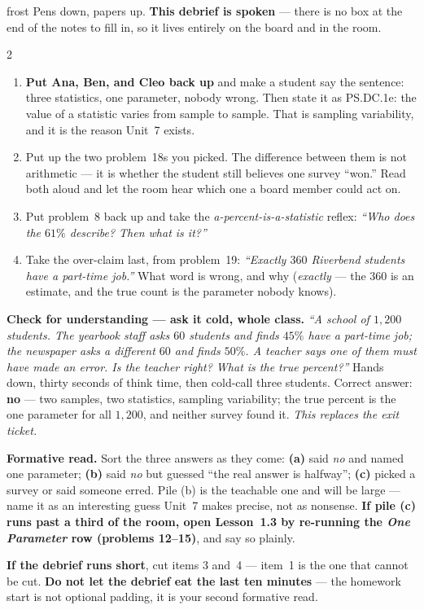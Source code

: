 \documentclass[10pt]{article}
\begin{document}
\boxguard[24]
\begin{skillbox}{frost}
Pens down, papers up. \textbf{This debrief is spoken} --- there is no box at the end of the
notes to fill in, so it lives entirely on the board and in the room.
\begin{multicols}{2}
\begin{enumerate}[leftmargin=1.3em, nosep, itemsep=3pt]
  \item \textbf{Put Ana, Ben, and Cleo back up} and make a student say the sentence: three
        statistics, one parameter, nobody wrong. Then state it as PS.DC.1e: the value of a
        statistic varies from sample to sample. That is sampling variability, and it is the
        reason Unit~7 exists.
  \item Put up the two problem~18s you picked. The difference between them is
        not arithmetic --- it is whether the student still believes one survey ``won.'' Read
        both aloud and let the room hear which one a board member could act on.
  \item Put problem~8 back up and take the \emph{a-percent-is-a-statistic} reflex:
        \emph{``Who does the $61\%$ describe? Then what is it?''}
  \item Take the over-claim last, from problem~19: \emph{``Exactly $360$ Riverbend students have a part-time job.''} What word is wrong, and why (\emph{exactly} --- the $360$ is an estimate, and the true count is the parameter nobody knows).
\end{enumerate}
\columnbreak
\textbf{Check for understanding --- ask it cold, whole class.} \emph{``A school of $1{,}200$
students. The yearbook staff asks $60$ students and finds $45\%$ have a part-time job; the
newspaper asks a different $60$ and finds $50\%$. A teacher says one of them must have made
an error. Is the teacher right? What is the true percent?''} Hands down, thirty seconds of
think time, then cold-call three students. Correct answer: \textbf{no} --- two samples, two
statistics, sampling variability; the true percent is the one parameter for all $1{,}200$,
and neither survey found it. \emph{This replaces the exit ticket.}

\textbf{Formative read.} Sort the three answers as they come: \textbf{(a)} said \emph{no} and
named one parameter; \textbf{(b)} said \emph{no} but guessed ``the real answer is halfway'';
\textbf{(c)} picked a survey or said someone erred. Pile (b) is the teachable one and will be
large --- name it as an interesting guess Unit~7 makes precise, not as nonsense. \textbf{If
pile (c) runs past a third of the room, open Lesson~1.3 by re-running the \emph{One Parameter} row
(problems 12--15)}, and say so plainly.

\textbf{If the debrief runs short}, cut items 3 and~4 --- item~1 is the one that cannot be
cut. \textbf{Do not let the debrief eat the last ten minutes} --- the homework start is not
optional padding, it is your second formative read.
\end{multicols}
\end{skillbox}
\end{document}
